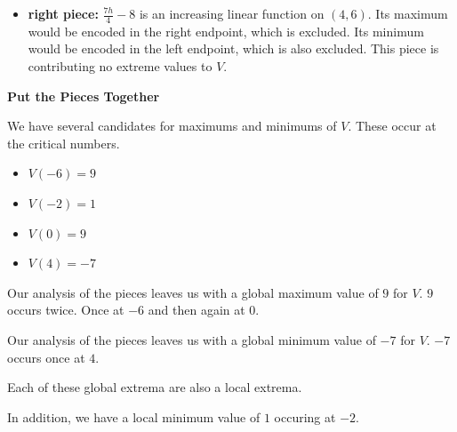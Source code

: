 \documentclass{ximera}
\begin{document}
\begin{itemize}
\begin{observation}
And, we can look at the instantaneous rate of change. The middle piece of $V$ is a quadratic, therefore, the vertex form $-(h-0)^2 + 9$ gives us $iRoC_V(h) = V'(h) = -2(h-0) = -2h$.  This equals $0$ at $0$, which means $0$ is a critical number and a possible location of changing behavior.

\end{observation}
Lastly, \\


  \item \textbf{right piece:}  \textbf{$\frac{7h}{4} - 8$} is an increasing linear function on $(4, 6)$.  Its maximum would be encoded in the right endpoint, which is excluded. Its minimum would be encoded in the left endpoint, which is also excluded. This piece is contributing no extreme values to $V$.
\end{itemize}








\textbf{\textcolor{blue!55!black}{Put the Pieces Together}} \


We have several candidates for maximums and minimums of $V$. These occur at the critical numbers.\\


\begin{itemize}
  \item $V(-6) = 9$
  \item $V(-2) = 1$
  \item $V(0) = 9$
  \item $V(4) = -7$
\end{itemize}




Our analysis of the pieces leaves us with a global maximum value of $9$ for $V$.  $9$ occurs twice.  Once at $-6$ and then again at $0$. 

Our analysis of the pieces leaves us with a global minimum value of $-7$ for $V$. $-7$ occurs once at $4$. 



Each of these global extrema are also a local extrema.  



In addition, we have a local minimum value of $1$ occuring at $-2$.  
\end{document}
